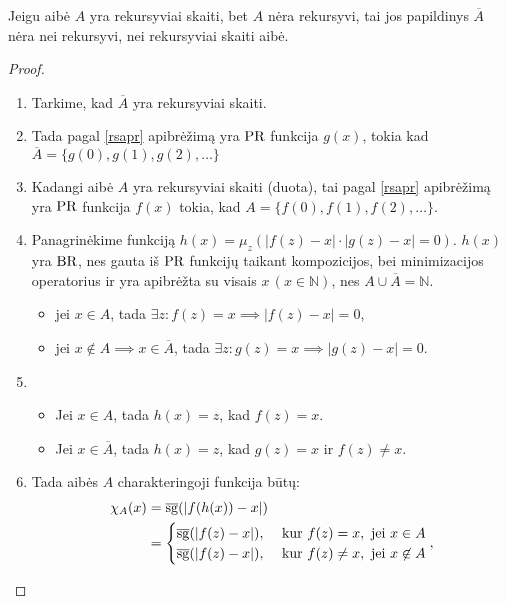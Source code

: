 \begin{prop}
  Jeigu aibė $A$ yra rekursyviai skaiti, bet $A$ nėra rekursyvi, tai
  jos papildinys $\overline{A}$ nėra nei rekursyvi, nei rekursyviai
  skaiti aibė.
  \begin{proof}
    \begin{enumerate}
      \item Tarkime, kad $\overline{A}$ yra rekursyviai skaiti.
      \item Tada pagal \ref{rsapr} apibrėžimą yra $\mathop{\text{PR}}$ funkcija
        $g(x)$, tokia kad $\overline{A} = \{g(0), g(1), g(2), \dotsc \}$
      \item Kadangi aibė $A$ yra rekursyviai skaiti (duota), tai 
        pagal \ref{rsapr} apibrėžimą yra $\mathop{\text{PR}}$ funkcija $f(x)$ tokia, kad
        $A = \{ f(0), f(1), f(2), \dotsc \}$.
      \item Panagrinėkime funkciją 
        $h(x) = \mu_{z}(|f(z)-x| \cdot |g(z)-x|=0)$. $h(x)$ yra
        $\mathop{\text{BR}}$, nes gauta iš $\mathop{\text{PR}}$ funkcijų taikant kompozicijos, bei
        minimizacijos operatorius ir yra apibrėžta su visais 
        $x \, (x \in \mathbb{N})$, nes $A \cup \overline{A} = \mathbb{N}$.
        \begin{itemize}
          \item jei $x \in A$, tada 
            $\exists z: f(z) = x \implies |f(z) - x| = 0$,
          \item jei $x \not \in A \implies x \in \overline{A}$, tada
            $\exists z: g(z) = x \implies |g(z) - x| = 0$.
        \end{itemize}
      \item 
        \begin{itemize}
          \item Jei $x \in A$, tada $h(x) = z$, kad $f(z) = x$.
          \item Jei $x \in \overline{A}$, tada $h(x) = z$, kad 
            $g(z) = x$ ir $f(z) \neq x$.
        \end{itemize}
      \item Tada aibės $A$ charakteringoji funkcija būtų:
        \begin{align*}
          \chi_{A}(x) &= \sgi(|f(h(x)) - x|) \\
          &=%
          \begin{cases}
            \sgi(|f(z) - x|), & \text{ kur } f(z) = x, %
              \text{ jei } x \in A\\
            \sgi(|f(z) - x|), & \text{ kur } f(z) \neq x, %
              \text{ jei } x \not \in A
          \end{cases},\\

\end{align*}
\end{enumerate}
\end{proof}
\end{prop}
